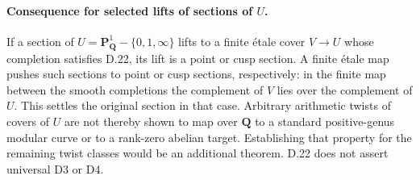 \paragraph{Consequence for selected lifts of sections of $U$.}
If a section of $U=\mathbf P^1_{\mathbf Q}-\{0,1,\infty\}$ lifts to a
finite \'etale cover $V\to U$ whose completion satisfies D.22, its lift
is a point or cusp section. A finite \'etale map pushes such sections
to point or cusp sections, respectively: in the finite map between
the smooth completions the complement of $V$ lies over the complement
of $U$. This settles the original section in that case. Arbitrary
arithmetic twists of covers of $U$ are not thereby shown to map over
$\mathbf Q$ to a standard positive-genus modular curve or to a
rank-zero abelian target. Establishing that property for the remaining
twist classes would be an additional theorem. D.22 does not assert
universal D3 or D4.
